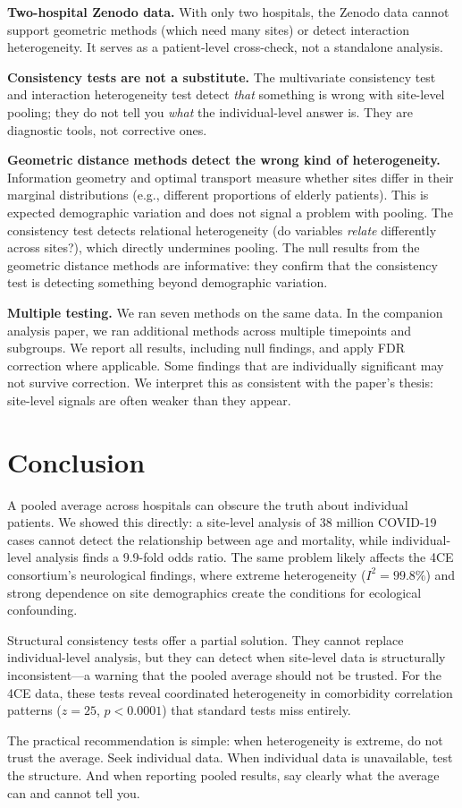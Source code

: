 \documentclass{article}
\begin{document}
\textbf{Two-hospital Zenodo data.}  With only two hospitals, the Zenodo data
cannot support geometric methods (which need many sites) or detect interaction
heterogeneity.  It serves as a patient-level cross-check, not a standalone
analysis.

\textbf{Consistency tests are not a substitute.}  The multivariate consistency
test and interaction heterogeneity test detect \emph{that} something is wrong
with site-level pooling; they do not tell you \emph{what} the
individual-level answer is.  They are diagnostic tools, not corrective ones.

\textbf{Geometric distance methods detect the wrong kind of heterogeneity.}
Information geometry and optimal transport measure whether sites differ in
their marginal distributions (e.g., different proportions of elderly patients).
This is expected demographic variation and does not signal a problem with
pooling.  The consistency test detects relational heterogeneity (do variables
\emph{relate} differently across sites?), which directly undermines pooling.
The null results from the geometric distance methods are informative: they
confirm that the consistency test is detecting something beyond demographic
variation.

\textbf{Multiple testing.}  We ran seven methods on the same data.  In the
companion analysis paper, we ran additional methods across multiple timepoints
and subgroups.  We report all results, including null findings, and apply
FDR correction where applicable.  Some findings that are individually
significant may not survive correction.  We interpret this as consistent with
the paper's thesis: site-level signals are often weaker than they appear.


\section{Conclusion}

A pooled average across hospitals can obscure the truth about individual
patients.  We showed this directly: a site-level analysis of 38 million
COVID-19 cases cannot detect the relationship between age and mortality, while
individual-level analysis finds a 9.9-fold odds ratio.  The same problem
likely affects the 4CE consortium's neurological findings, where extreme
heterogeneity ($I^2 = 99.8\%$) and strong dependence on site demographics
create the conditions for ecological confounding.

Structural consistency tests offer a partial solution.  They cannot replace
individual-level analysis, but they can detect when site-level data is
structurally inconsistent---a warning that the pooled average should not be
trusted.  For the 4CE data, these tests reveal coordinated heterogeneity
in comorbidity correlation patterns ($z = 25$, $p < 0.0001$) that standard
tests miss entirely.

The practical recommendation is simple: when heterogeneity is extreme, do not
trust the average.  Seek individual data.  When individual data is
unavailable, test the structure.  And when reporting pooled results, say
clearly what the average can and cannot tell you.




\end{document}
